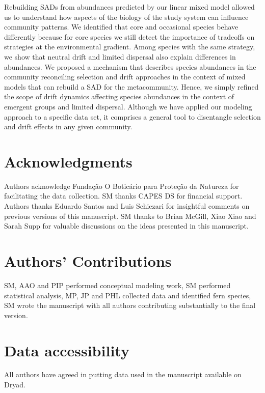 \documentclass[12pt]{article}
\begin{document}
Rebuilding SADs from abundances predicted by our linear mixed model allowed us to understand how aspects of the biology of the study system can influence community patterns. We identified that core and occasional species behave differently because for core species we still detect the importance of tradeoffs on strategies at the environmental gradient. Among species with the same strategy, we show that
neutral drift and limited dispersal also explain differences in abundances.
We proposed a mechanism that %
describes
species abundances in the community reconciling selection and drift approaches in the context of mixed models that can rebuild a SAD for the metacommunity. Hence, we simply refined the scope of drift dynamics affecting species abundances in the context of emergent groups and limited dispersal. Although we have applied our modeling approach to a specific data set, it comprises a general tool to disentangle selection and drift effects in any given community. 



\section*{Acknowledgments} 
Authors acknowledge Fundação O Boticário para Proteção da Natureza for facilitating the data collection. SM thanks CAPES DS for financial support. Authors thanks Eduardo Santos and Luis Schiezari for insightful comments on previous versions of this manuscript. SM thanks to Brian McGill, Xiao Xiao and Sarah Supp for valuable discussions on the ideas presented in this manuscript.

\section*{Authors' Contributions} 
SM, AAO and PIP performed conceptual modeling work, SM performed statistical analysis, MP, JP and PHL collected data and identified fern species, SM wrote the manuscript with all authors contributing substantially to the final version.

\section*{Data accessibility} 
All authors have agreed in putting data used in the manuscript available on Dryad.
\end{document}
